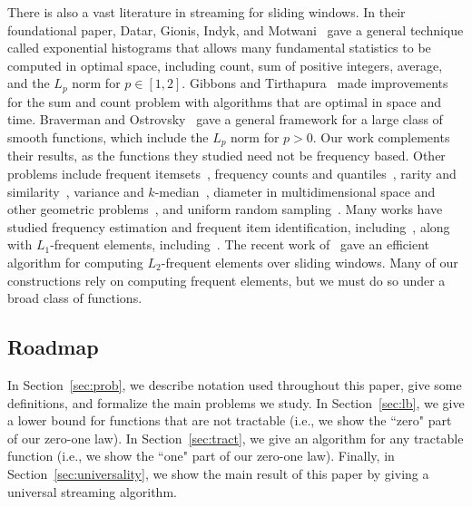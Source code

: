 \documentclass[11pt]{article}
\begin{document}
There is also a vast literature in streaming for sliding
windows.  In their foundational paper, Datar, Gionis, Indyk, and Motwani~\cite{DGIM02}
gave a general technique called exponential histograms that allows many fundamental
statistics to be computed in optimal space, including count, sum
of positive integers, average, and the $L_p$ norm for $p \in [1,2]$.
Gibbons and Tirthapura~\cite{GT02} made improvements for the sum and count problem
with algorithms that are optimal in space and time.  Braverman and Ostrovsky~\cite{BO07}
gave a general framework for a large class of smooth functions, which include the $L_p$ norm
for $p > 0$.  Our work complements their results, as
the functions they studied need not be frequency based.  Other problems include frequent itemsets~\cite{CWYM04}, frequency counts and
quantiles~\cite{AM04,LT06PODS}, rarity and similarity~\cite{DM02}, variance and $k$-median~\cite{BDMO03},
diameter in multidimensional space and other geometric problems~\cite{FKZ05,CS04,AHV05}, and uniform
random sampling~\cite{BDM02}.  Many works have studied frequency estimation and frequent item identification,
including~\cite{GDDLM03,JQSYZ03,CM05TRANS}, along with $L_1$-frequent elements,
including~\cite{HT08,ZG08,BAE07,HLT10,NL05}.  The recent work of~\cite{BGO13} gave an efficient
algorithm for computing $L_2$-frequent elements over sliding windows.  Many of our constructions rely
on computing frequent elements, but we must do so under a broad class of functions.


\subsection{Roadmap}
In Section~\ref{sec:prob}, we describe notation used throughout this paper, give some definitions, and formalize the main
problems we study.  In Section~\ref{sec:lb}, we give a lower bound for functions that are not tractable (i.e., we show the ``zero"
part of our zero-one law).  In Section~\ref{sec:tract}, we give an algorithm for any tractable function (i.e., we show the ``one" part
of our zero-one law).  Finally, in Section~\ref{sec:universality}, we show the main result of this paper by giving a universal
streaming algorithm.
\end{document}
